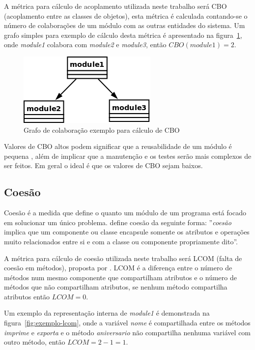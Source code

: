 A métrica para cálculo de acoplamento utilizada neste trabalho será CBO
(acoplamento entre as classes de objetos), esta métrica é calculada contando-se
o número de colaborações de um módulo com as outras entidades do sistema.  Um
grafo simples para exemplo de cálculo desta métrica é apresentado na
figura~\ref{fig:exemplo-cbo}, onde {\it module1} colabora com {\it module2} e
{\it module3}, então $CBO(module1) = 2$.

\begin{figure}[h]
\center
\includegraphics[scale=0.4]{imagens/exemplo-cbo}
\caption{Grafo de colaboração exemplo para cálculo de CBO}
\label{fig:exemplo-cbo}
\end{figure}

Valores de CBO altos podem significar que a reusabilidade de um módulo é
pequena \cite{engenhariaDeSoftwarePressman}, além de implicar que a manutenção
e os testes serão mais complexos de ser feitos. Em geral o ideal é que os
valores de CBO sejam baixos.

\subsection{Coesão}

Coesão é a medida que define o quanto um módulo de um programa está focado em
solucionar um único problema.  define
coesão da seguinte forma: ''{\it coesão} implica que um componente ou classe
encapsule somente os atributos e operações muito relacionados entre si e com a
classe ou componente propriamente dito''.

A métrica para cálculo de coesão utilizada neste trabalho será LCOM (falta de
coesão em métodos), proposta por . LCOM é a
diferença entre o número de métodos num mesmo componente que compartilham
atributos e o número de métodos que não compartilham atributos, se nenhum
método compartilha atributos então $LCOM = 0$.

Um exemplo da representação interna de {\it module1} é demonstrada na
figura~\ref{fig:exemplo-lcom}, onde a variável {\it nome} é compartilhada entre
os métodos {\it imprime} e {\it exporta} e o método {\it aniversario} não
compartilha nenhuma variável com outro método, então $LCOM = 2 - 1 = 1$.

